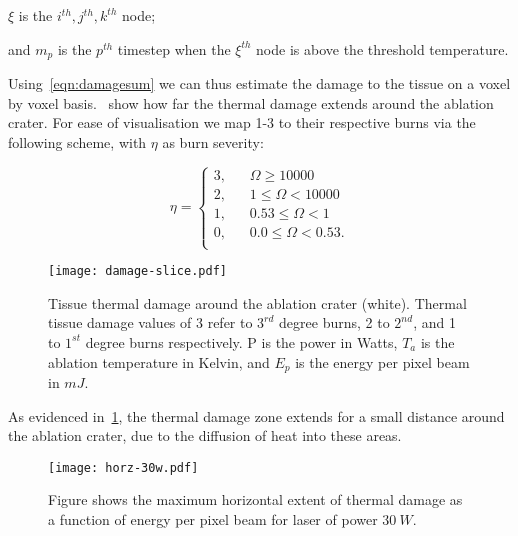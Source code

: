 	\indent $\xi$ is the $i^{th}, j^{th}, k^{th}$ node;
	
	\indent and $m_p$ is the $p^{th}$ timestep when the $\xi^{th}$ node is above the threshold temperature.

	\medskip
	
	Using~\cref{eqn:damagesum} we can thus estimate the damage to the tissue on a voxel by voxel basis.~ show how far the thermal damage extends around the ablation crater. For ease of visualisation we map 1-3 to their respective burns via the following scheme, with $\eta$ as burn severity:
	
\begin{equation}
\eta = 
     \begin{cases}
       \text{3,} &\quad \Omega \geq 10000\\
       \text{2,} &\quad 1 \leq \Omega < 10000\\
       \text{1,} &\quad 0.53 \leq \Omega < 1\\
       \text{0,} &\quad 0.0 \leq \Omega< 0.53.\\
     \end{cases}
\label{eqn:thermalbound}
\end{equation}

\begin{figure}[!h]
	\centering
	\texttt{[image: damage-slice.pdf]}
	\caption{Tissue thermal damage around the ablation crater (white). Thermal tissue damage values of 3 refer to $3^{rd}$ degree burns, 2 to $2^{nd}$, and 1 to $1^{st}$ degree burns respectively. P is the power in Watts, $T_a$ is the ablation temperature in Kelvin, and $E_p$ is the energy per pixel beam in $mJ$.}
	\label{fig:damfig}
\end{figure}
	
As evidenced in~\cref{fig:damfig}, the thermal damage zone extends for a small distance around the ablation crater, due to the diffusion of heat into these areas. %
	
\begin{figure}[!h]
	\centering
	\texttt{[image: horz-30w.pdf]}
	\caption{Figure shows the maximum horizontal extent of thermal damage as a function of energy per pixel beam for laser of power $30~W$.}
	\label{fig:horz-30}
\end{figure}

